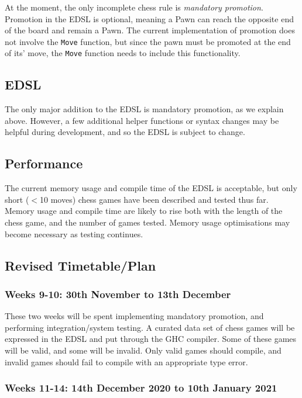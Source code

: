 \documentclass[12pt, a4paper]{scrartcl}
\begin{document}
At the moment, the only incomplete chess rule is \emph{mandatory promotion}. Promotion in the EDSL is optional, meaning a Pawn can reach the opposite end of the board and remain a Pawn. The current implementation of promotion does not involve the \lstinline{Move} function, but since the pawn must be promoted at the end of its' move, the \lstinline{Move} function needs to include this functionality.

\subsection{EDSL}

The only major addition to the EDSL is mandatory promotion, as we explain above. However, a few additional helper functions or syntax changes may be helpful during development, and so the EDSL is subject to change.

\subsection{Performance}

The current memory usage and compile time of the EDSL is acceptable, but only short ($<$10 moves) chess games have been described and tested thus far. Memory usage and compile time are likely to rise both with the length of the chess game, and the number of games tested. Memory usage optimisations may become necessary as testing continues.

\subsection{Revised Timetable/Plan}

\subsubsection{Weeks 9-10: 30th November to 13th December}

These two weeks will be spent implementing mandatory promotion, and performing integration/system testing. A curated data set of chess games will be expressed in the EDSL and put through the GHC compiler. Some of these games will be valid, and some will be invalid. Only valid games should compile, and invalid games should fail to compile with an appropriate type error.

\subsubsection{Weeks 11-14: 14th December 2020 to 10th January 2021}
\end{document}
